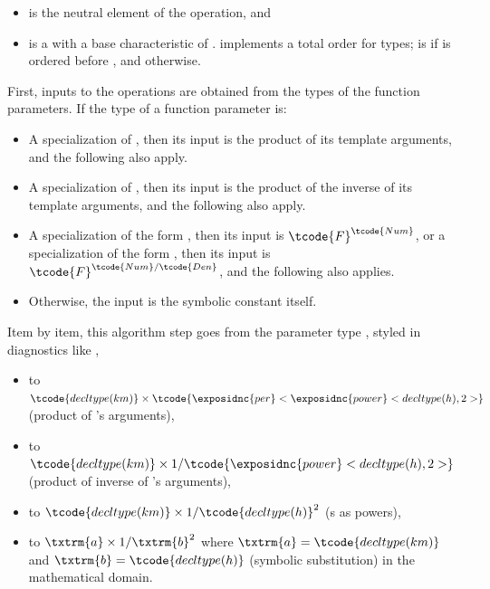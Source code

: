 \begin{itemdescr}
\pnum
\mandates
\begin{itemize}
\item
{} is the neutral element of the operation, and
\item
{} is a 
with a base characteristic of .
 implements a total order for types;
 is  if  is ordered before , and  otherwise.
\end{itemize}

\pnum
\effects
\pnum
First, inputs to the operations are obtained from the types of the function parameters.
If the type of a function parameter is:
\begin{itemize}
\item
A specialization of ,
then its input is the product of its template arguments, and
the following also apply.
\item
A specialization of ,
then its input is the product of the inverse of its template arguments, and
the following also apply.
\item
A specialization of the form ,
then its input is $\tcode{F}^\tcode{Num}$, or
a specialization of the form ,
then its input is $\tcode{F}^{\tcode{Num}/\tcode{Den}}$, and
the following also applies.
\item
Otherwise, the input is the symbolic constant itself.
\end{itemize}
\begin{example}
Item by item, this algorithm step goes from the \Cpp{} parameter type
,
styled in diagnostics like
,
\begin{itemize}
\item
to $\tcode{decltype(km)} \times \tcode{\exposidnc{per}<\exposidnc{power}<decltype(h), 2>}$ (product of 's arguments),
\item
to $\tcode{decltype(km)} \times 1/\tcode{\exposidnc{power}<decltype(h), 2>}$ (product of inverse of 's arguments),
\item
to $\tcode{decltype(km)} \times 1/\tcode{decltype(h)}^2$ (s as powers),
\item
to $\txtrm{a} \times 1/\txtrm{b}^2$ where $\txtrm{a} = \tcode{decltype(km)}$ and $\txtrm{b} = \tcode{decltype(h)}$ (symbolic substitution)
in the mathematical domain.
\end{itemize}
\end{example}


\end{itemdescr}
